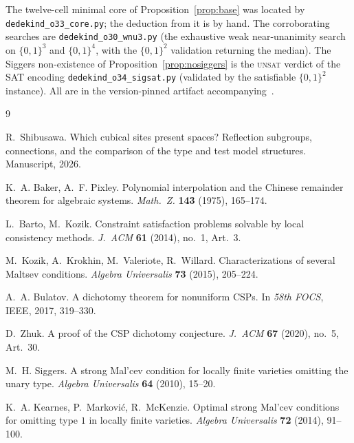 \documentclass[11pt]{amsart}
\theoremstyle{plain}
\theoremstyle{definition}
\newcommand{\B}{\{0,1\}}
\begin{document}
The twelve-cell minimal core of Proposition~\ref{prop:base} was located
by \texttt{dedekind\_o33\_core.py}; the deduction from it is by hand.
The corroborating searches are \texttt{dedekind\_o30\_wnu3.py} (the
exhaustive weak near-unanimity search on $\B^3$ and $\B^4$, with the
$\B^2$ validation returning the median).  The Siggers non-existence of
Proposition~\ref{prop:nosiggers} is the \textsc{unsat} verdict of the
SAT encoding \texttt{dedekind\_o34\_sigsat.py} (validated by the
satisfiable $\B^2$ instance).  All are in the version-pinned artifact
accompanying~\cite{PaperW}.

\begin{thebibliography}{9}

R.~Shibusawa.
\newblock Which cubical sites present spaces?  Reflection subgroups,
  connections, and the comparison of the type and test model
  structures.
\newblock Manuscript, 2026.

K.~A. Baker, A.~F. Pixley.
\newblock Polynomial interpolation and the Chinese remainder theorem
  for algebraic systems.
\newblock \emph{Math.\ Z.} \textbf{143} (1975), 165--174.

L.~Barto, M.~Kozik.
\newblock Constraint satisfaction problems solvable by local
  consistency methods.
\newblock \emph{J.\ ACM} \textbf{61} (2014), no.~1, Art.~3.

M.~Kozik, A.~Krokhin, M.~Valeriote, R.~Willard.
\newblock Characterizations of several Maltsev conditions.
\newblock \emph{Algebra Universalis} \textbf{73} (2015), 205--224.

A.~A. Bulatov.
\newblock A dichotomy theorem for nonuniform CSPs.
\newblock In \emph{58th FOCS}, IEEE, 2017, 319--330.

D.~Zhuk.
\newblock A proof of the CSP dichotomy conjecture.
\newblock \emph{J.\ ACM} \textbf{67} (2020), no.~5, Art.~30.

M.~H. Siggers.
\newblock A strong Mal'cev condition for locally finite varieties
  omitting the unary type.
\newblock \emph{Algebra Universalis} \textbf{64} (2010), 15--20.

K.~A. Kearnes, P.~Markovi\'c, R.~McKenzie.
\newblock Optimal strong Mal'cev conditions for omitting type $1$ in
  locally finite varieties.
\newblock \emph{Algebra Universalis} \textbf{72} (2014), 91--100.

\end{thebibliography}
\end{document}
